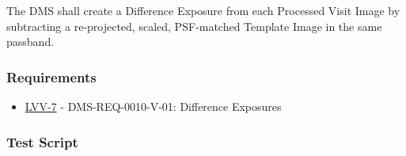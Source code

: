 The DMS shall create a Difference Exposure from each Processed Visit
Image by subtracting a re-projected, scaled, PSF-matched Template Image
in the same passband.

\hypertarget{requirements-13}{%
\subsubsection{Requirements}\label{requirements-13}}

\begin{itemize}
\tightlist
\item
  \href{https://jira.lsstcorp.org/browse/LVV-7}{LVV-7} -
  DMS-REQ-0010-V-01: Difference Exposures
\end{itemize}

\hypertarget{test-script-13}{%
\subsubsection{Test Script}\label{test-script-13}}

